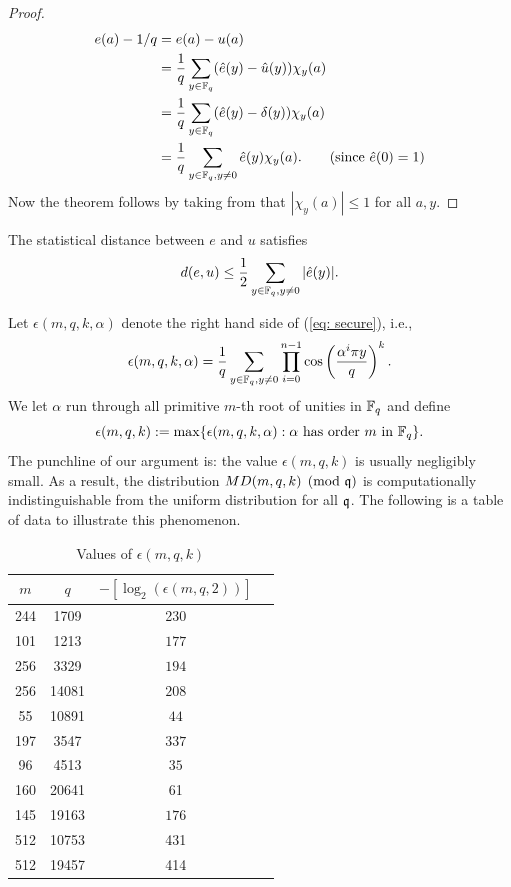 \documentclass{amsart}
\begin{document}
\begin{proof}
\begin{align*}
    e(a) - 1/q &= e(a) - u(a) \\
    & = \frac{1}{q} \sum_{y \in \mathbb{F}_q} (\hat{e}(y) - \hat{u}(y) )\chi_y(a) \\
& = \frac{1}{q} \sum_{y \in \mathbb{F}_q} (\hat{e}(y) - \delta(y) )\chi_y(a) \\
& = \frac{1}{q} \sum_{y \in \mathbb{F}_q, y \neq 0} \hat{e}(y) \chi_y(a).  \qquad \mbox{(since $\hat{e}(0) = 1$)}
\end{align*}
Now the theorem follows by taking from that $|\chi_y(a)| \leq 1$ for all $a, y$.
\end{proof}

\begin{Corollary}
The statistical distance between $e$ and $u$ satisfies $$d(e,u) \leq \frac{1}{2}  \sum_{y \in \mathbb{F}_q, y \neq 0}  |\hat{e}(y)|.$$
\end{Corollary}



Let $\epsilon(m,q,k,\alpha)$ denote the right hand side of (\ref{eq: secure}), i.e.,
\[
    \epsilon(m,q,k, \alpha) = \frac{1}{q}\sum_{y \in \mathbb{F}_q, y \neq 0} \prod_{i=0}^{n-1} \cos \left(\frac{ \alpha^i \pi y}{q} \right)^k.
\]
We let $\alpha$ run through all primitive $m$-th root of unities in $\mathbb{F}_q$ and define
$$\epsilon(m,q,k) := \max \{\epsilon(m,q,k,\alpha): \alpha \mbox{ has order } m \mbox{ in } \mathbb{F}_q\}.$$
The punchline of our argument is: the value $\epsilon(m,q,k)$ is usually negligibly small. As a result, the distribution $MD(m,q,k) \pmod {\mathfrak{q}}$ is computationally indistinguishable from the uniform distribution for all $\mathfrak{q}$. The following is a table of data to illustrate this phenomenon.

\FloatBarrier
\begin{table}[H]
\caption{Values of $\epsilon(m,q,k)$}
\begin{tabular}{c|c|c|c}
$m$ & $q$ & $-[\log_2(\epsilon(m,q, 2))]$ \\
\hline
244 & 1709 & 230 \\
101 & 1213 & $177$ \\
256 & 3329 & $194$ \\
256 & 14081 & $208$ \\
55 & 10891  & $44$ \\
197 & 3547 & $337$ \\
96 & 4513 & $35$ \\
160 & 20641 & 61 \\
145 & 19163 & $176$ \\
512 & 10753 & 431 \\
512 & 19457 & 414
\end{tabular}
\end{table}
\end{document}
